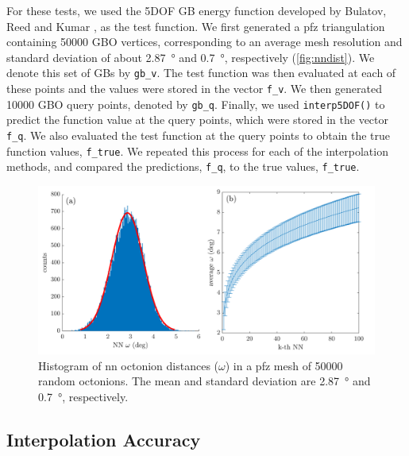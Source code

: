 \documentclass[preprint,12pt]{elsarticle}
\begin{document}
For these tests, we used the 5DOF GB energy function developed by Bulatov, Reed and Kumar \cite{bulatovGrainBoundaryEnergy2014}, as the test function. We first generated a \gls{pfz} triangulation containing \num{50000} GBO vertices, corresponding to an average mesh resolution and standard deviation of about \SI{2.87}{\degree} and \SI{0.7}{\degree}, respectively (\cref{fig:nndist}). We denote this set of GBs by \texttt{gb\_v}. The test function was then evaluated at each of these points and the values were stored in the vector \texttt{f\_v}. We then generated \num{10000} GBO query points, denoted by \texttt{gb\_q}. Finally, we used \texttt{interp5DOF()} to predict the function value at the query points, which were stored in the vector \texttt{f\_q}. We also evaluated the test function at the query points to obtain the true function values, \texttt{f\_true}. We repeated this process for each of the interpolation methods, and compared the predictions, \texttt{f\_q}, to the true values, \texttt{f\_true}.
\begin{figure}
\centering
\includegraphics[width=0.5\linewidth]{nnhist-knn-50000.png}
\caption{Histogram of \gls{nn} octonion distances ($\omega$) in a \gls{pfz} mesh of \num{50000} random octonions. The mean and standard deviation are \SI{2.87}{\degree} and \SI{0.7}{\degree}, respectively.} %
\label{fig:nnhist-knn-50000}
\end{figure}

\subsection{Interpolation Accuracy}
\label{sec:results:accuracy}
\end{document}
